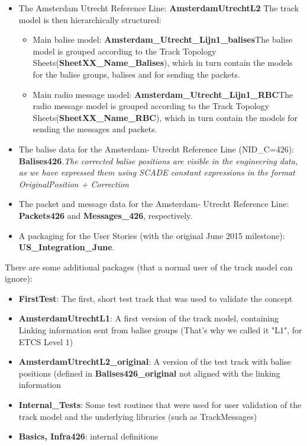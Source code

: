 \documentclass{template/openetcs_article}
\begin{document}
\begin{itemize}
 \item The Amsterdam Utrecht Reference Line: \textbf{AmsterdamUtrechtL2}\newline
 The track model is then hierarchically structured:
  \begin{itemize}
   \item Main balise model: \textbf{Amsterdam\_Utrecht\_Lijn1\_balises}\newline The balise model is grouped according to the Track Topology Sheets\newline (\textbf{SheetXX\_Name\_Balises}), which in turn contain the models for the balise groups, balises and for sending the  packets. 
   \item Main radio message model: \textbf{Amsterdam\_Utrecht\_Lijn1\_RBC}\newline The radio message model is grouped according to the Track Topology Sheets\newline (\textbf{SheetXX\_Name\_RBC}), which in turn contain the models for sending the messages and packets. 

  \end{itemize}
 \item The balise data for the Amsterdam- Utrecht Reference Line (NID\_C=426): \textbf{Balises426}.\newline \emph{The corrected balise positions are visible in the engineering data, as we have expressed them using SCADE constant expressions in the format OriginalPosition + Correction}
 \item The packet and message data for the Amsterdam- Utrecht Reference Line:  \textbf{Packets426} and \textbf{Messages\_426}, respectively.
 \item A packaging for the User Stories (with the original June 2015 milestone): \textbf{US\_Integration\_June}.
 \end {itemize}


There are some additional packages (that a normal user of the track model can ignore):
\begin{itemize}
 \item \textbf{FirstTest}: The first, short test track that was used to validate the concept
 \item \textbf{AmsterdamUtrechtL1}: A first version of the track model, containing Linking information sent from balise groups (That's why we called it "L1", for ETCS Level 1)
 \item \textbf{AmsterdamUtrechtL2\_original}: A version of the test track with balise positions (defined in \textbf{Balises426\_original} not aligned with the linking information
 \item \textbf{Internal\_Tests}: Some test routines that were used for user validation of the track model and the underlying libraries (such as TrackMessages)
 \item \textbf{Basics, Infra426}: internal definitions
\end{itemize} 
\end{document}
